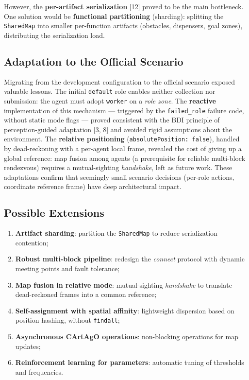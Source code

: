 \documentclass[11pt,a4paper]{article}
\newcommand{\code}[1]{\texttt{#1}}
\begin{document}
However, the \textbf{per-artifact serialization} [12] proved to be the main bottleneck. One solution would be \textbf{functional partitioning} (sharding): splitting the \code{SharedMap} into smaller per-function artifacts (obstacles, dispensers, goal zones), distributing the serialization load.

\subsection{Adaptation to the Official Scenario}
Migrating from the development configuration to the official scenario exposed valuable lessons. The initial \code{default} role enables neither collection nor submission: the agent must adopt \code{worker} on a \emph{role zone}. The \textbf{reactive} implementation of this mechanism --- triggered by the \code{failed\_role} failure code, without static mode flags --- proved consistent with the BDI principle of perception-guided adaptation [3, 8] and avoided rigid assumptions about the environment. The \textbf{relative positioning} (\code{absolutePosition: false}), handled by dead-reckoning with a per-agent local frame, revealed the cost of giving up a global reference: map fusion among agents (a prerequisite for reliable multi-block rendezvous) requires a mutual-sighting \emph{handshake}, left as future work. These adaptations confirm that seemingly small scenario decisions (per-role actions, coordinate reference frame) have deep architectural impact.

\subsection{Possible Extensions}
\begin{enumerate}
  \item \textbf{Artifact sharding}: partition the \code{SharedMap} to reduce serialization contention;
  \item \textbf{Robust multi-block pipeline}: redesign the \emph{connect} protocol with dynamic meeting points and fault tolerance;
  \item \textbf{Map fusion in relative mode}: mutual-sighting \emph{handshake} to translate dead-reckoned frames into a common reference;
  \item \textbf{Self-assignment with spatial affinity}: lightweight dispersion based on position hashing, without \code{findall};
  \item \textbf{Asynchronous CArtAgO operations}: non-blocking operations for map updates;
  \item \textbf{Reinforcement learning for parameters}: automatic tuning of thresholds and frequencies.
\end{enumerate}
\end{document}
